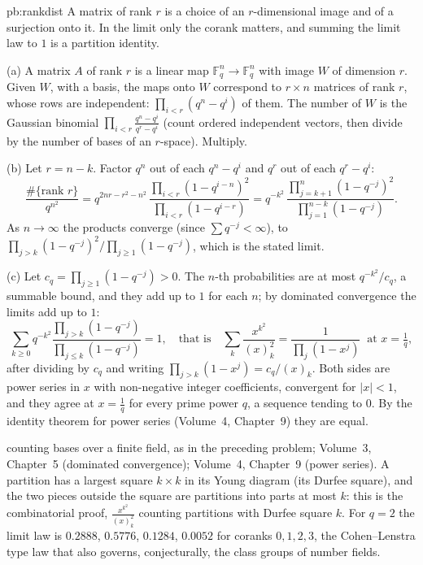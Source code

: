 \begin{solution}{pb:rankdist}
\idea A matrix of rank $r$ is a choice of an $r$-dimensional image and of a surjection onto it. In the limit only the corank
matters, and summing the limit law to $1$ is a partition identity.

\writeup (a) A matrix $A$ of rank $r$ is a linear map $\mathbb F_q^n\to\mathbb F_q^n$ with image $W$ of dimension $r$. Given $W$, with a
basis, the maps onto $W$ correspond to $r\times n$ matrices of rank $r$, whose rows are independent: $\prod_{i<r}(q^n-q^i)$ of them.
The number of $W$ is the Gaussian binomial $\prod_{i<r}\frac{q^n-q^i}{q^r-q^i}$ (count ordered independent vectors, then divide by the number of bases of an $r$-space). Multiply.

(b) Let $r=n-k$. Factor $q^n$ out of each $q^n-q^i$ and $q^r$ out of each $q^r-q^i$:
\[
\frac{\#\{\text{rank }r\}}{q^{n^2}}=q^{2nr-r^2-n^2}\,\frac{\prod_{i<r}(1-q^{i-n})^2}{\prod_{i<r}(1-q^{i-r})}
=q^{-k^2}\,\frac{\prod_{j=k+1}^{n}(1-q^{-j})^2}{\prod_{j=1}^{n-k}(1-q^{-j})}.
\]
As $n\to\infty$ the products converge (since $\sum q^{-j}<\infty$), to $\prod_{j>k}(1-q^{-j})^2/\prod_{j\ge1}(1-q^{-j})$, which is the
stated limit.

(c) Let $c_q=\prod_{j\ge1}(1-q^{-j})>0$. The $n$-th probabilities are at most $q^{-k^2}/c_q$, a summable bound, and they add up to
$1$ for each $n$; by dominated convergence the limits add up to $1$:
\[
\sum_{k\ge0}q^{-k^2}\frac{\prod_{j>k}(1-q^{-j})}{\prod_{j\le k}(1-q^{-j})}=1,\quad\text{that is}\quad
\sum_k\frac{x^{k^2}}{(x)_k^2}=\frac1{\prod_j(1-x^j)}\ \text{ at }x=\tfrac1q,
\]
after dividing by $c_q$ and writing $\prod_{j>k}(1-x^j)=c_q/(x)_k$. Both sides are power series in $x$ with non-negative integer
coefficients, convergent for $|x|<1$, and they agree at $x=\frac1q$ for every prime power $q$, a sequence tending to $0$. By the
identity theorem for power series (Volume~4, Chapter~9) they are equal.

\tools counting bases over a finite field, as in the preceding problem; Volume~3, Chapter~5 (dominated convergence);
Volume~4, Chapter~9 (power series).
\leads A partition has a largest square $k\times k$ in its Young diagram (its Durfee square), and the two pieces outside the square
are partitions into parts at most $k$: this is the combinatorial proof, $\frac{x^{k^2}}{(x)_k^2}$ counting partitions with
Durfee square $k$. For $q=2$ the limit law is $0.2888$, $0.5776$, $0.1284$, $0.0052$ for coranks $0,1,2,3$, the Cohen--Lenstra
type law that also governs, conjecturally, the class groups of number fields.
\end{solution}

